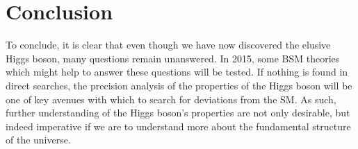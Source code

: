 \documentclass[10pt]{article}
\begin{document}
\section{Conclusion}

To conclude, it is clear that even though we have now discovered the elusive Higgs boson, many questions remain unanswered. In 2015, some BSM theories which might help to answer these questions will be tested. If nothing is found in direct searches, the precision analysis of the properties of the Higgs boson will be one of key avenues with which to search for deviations from the SM. As such, further understanding of the Higgs boson's properties are not only desirable, but indeed imperative if we are to understand more about the fundamental  structure of the universe.




\end{document}
